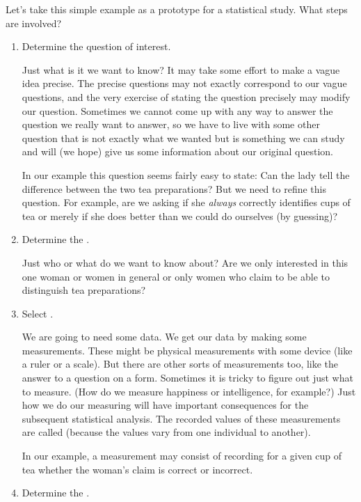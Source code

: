 \iffalse
Let's take this simple example as a prototype for a statistical study.
What steps are involved?  
\begin{enumerate}
  \item Determine the question of interest.

	Just what is it we want to know?  It may take some effort to 
	make a vague idea precise.  The precise questions may not exactly
	correspond to our vague questions, and the very exercise of 
	stating the question precisely may modify our question.  Sometimes
	we cannot come up with any way to answer the question we really want
	to answer, so we have to live with some other question that is 
	not exactly what we wanted but is something we can study and will
	(we hope) give us some information about our original question.

	In our example this question seems fairly easy to state:
	Can the lady tell the difference between the two tea preparations?
	But we need to refine this question.  For example, are we 
	asking if she \emph{always} correctly identifies cups of tea
	or merely if she does better than we could do ourselves (by 
	guessing)?  

  \item 
	Determine the . 

	Just who or what do we want to know about?  Are we only interested in
	this one woman or women in general or only women who claim to
	be able to distinguish tea preparations?

  \item
	Select .

	We are going to need some data.  
	We get our data by making some measurements.
	These might be physical measurements with some device (like a ruler
	or a scale).
	But there are other sorts of measurements too, 
	like the answer to a question on a form.
	Sometimes it is tricky to figure out just what to measure.
	(How do we measure happiness or intelligence, for example?)
	Just how we do our measuring will have important consequences 
	for the subsequent statistical analysis.
	The recorded values of these measurements are called
	 (because the values vary from one individual to another).

	In our example, a measurement may consist of recording for a given
	cup of tea whether the woman's claim is correct or incorrect.

  \item
	Determine the .


\end{enumerate}
